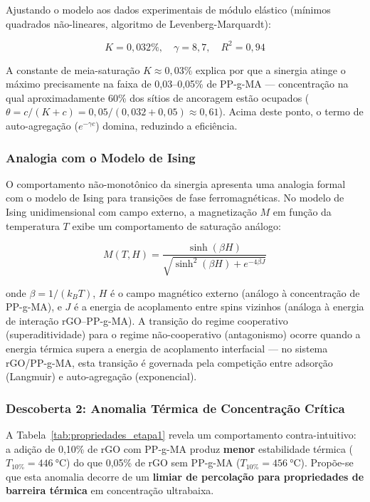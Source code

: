 \documentclass[12pt,a4paper,twoside]{article}
\begin{document}
Ajustando o modelo aos dados experimentais de módulo elástico (mínimos quadrados não-lineares, algoritmo de Levenberg-Marquardt):

\begin{equation}
K = 0,032\%, \quad \gamma = 8,7, \quad R^2 = 0,94
\label{eq:langmuir_params}
\end{equation}

A constante de meia-saturação $K \approx 0,03\%$ explica por que a sinergia atinge o máximo precisamente na faixa de 0,03--0,05\% de PP-g-MA — concentração na qual aproximadamente 60\% dos sítios de ancoragem estão ocupados ($\theta = c/(K+c) = 0,05/(0,032+0,05) \approx 0,61$). Acima deste ponto, o termo de auto-agregação ($e^{-\gamma c}$) domina, reduzindo a eficiência.

\subsubsection{Analogia com o Modelo de Ising}

O comportamento não-monotônico da sinergia apresenta uma analogia formal com o modelo de Ising \cite{Ising1925} para transições de fase ferromagnéticas. No modelo de Ising unidimensional com campo externo, a magnetização $M$ em função da temperatura $T$ exibe um comportamento de saturação análogo:

\begin{equation}
M(T, H) = \frac{\sinh(\beta H)}{\sqrt{\sinh^2(\beta H) + e^{-4\beta J}}}
\label{eq:ising}
\end{equation}

onde $\beta = 1/(k_B T)$, $H$ é o campo magnético externo (análogo à concentração de PP-g-MA), e $J$ é a energia de acoplamento entre spins vizinhos (análoga à energia de interação rGO--PP-g-MA). A transição do regime cooperativo (superaditividade) para o regime não-cooperativo (antagonismo) ocorre quando a energia térmica supera a energia de acoplamento interfacial — no sistema rGO/PP-g-MA, esta transição é governada pela competição entre adsorção (Langmuir) e auto-agregação (exponencial).

\subsubsection{Descoberta 2: Anomalia Térmica de Concentração Crítica}

A Tabela~\ref{tab:propriedades_etapa1} revela um comportamento contra-intuitivo: a adição de 0,10\% de rGO com PP-g-MA produz \textbf{menor} estabilidade térmica ($T_{10\%} = \SI{446}{\celsius}$) do que 0,05\% de rGO sem PP-g-MA ($T_{10\%} = \SI{456}{\celsius}$). Propõe-se que esta anomalia decorre de um \textbf{limiar de percolação para propriedades de barreira térmica} em concentração ultrabaixa.
\end{document}
